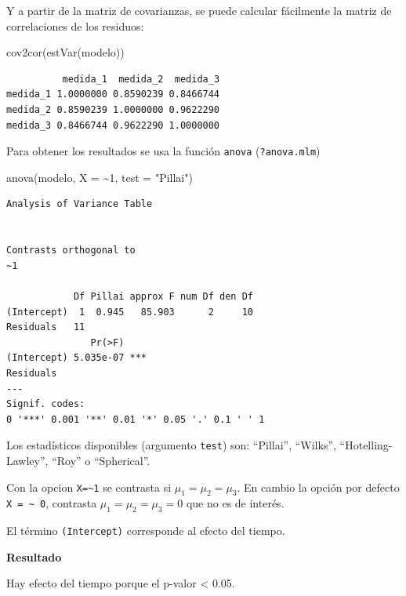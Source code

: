 \documentclass[
]{book}
\newenvironment{Shaded}{\begin{snugshade}}{\end{snugshade}}
\newcommand{\AttributeTok}[1]{\textcolor[rgb]{0.77,0.63,0.00}{#1}}
\newcommand{\DecValTok}[1]{\textcolor[rgb]{0.00,0.00,0.81}{#1}}
\newcommand{\FunctionTok}[1]{\textcolor[rgb]{0.00,0.00,0.00}{#1}}
\newcommand{\NormalTok}[1]{#1}
\newcommand{\SpecialCharTok}[1]{\textcolor[rgb]{0.00,0.00,0.00}{#1}}
\newcommand{\StringTok}[1]{\textcolor[rgb]{0.31,0.60,0.02}{#1}}
\begin{document}
Y a partir de la matriz de covarianzas, se puede calcular fácilmente la matriz de correlaciones de los residuos:

\begin{Shaded}
\begin{Highlighting}[]
\FunctionTok{cov2cor}\NormalTok{(}\FunctionTok{estVar}\NormalTok{(modelo))}
\end{Highlighting}
\end{Shaded}

\begin{verbatim}
          medida_1  medida_2  medida_3
medida_1 1.0000000 0.8590239 0.8466744
medida_2 0.8590239 1.0000000 0.9622290
medida_3 0.8466744 0.9622290 1.0000000
\end{verbatim}

Para obtener los resultados se usa la función \texttt{anova} (\texttt{?anova.mlm})

\begin{Shaded}
\begin{Highlighting}[]
\FunctionTok{anova}\NormalTok{(modelo, }\AttributeTok{X =} \SpecialCharTok{\textasciitilde{}}\DecValTok{1}\NormalTok{, }\AttributeTok{test =} \StringTok{"Pillai"}\NormalTok{)}
\end{Highlighting}
\end{Shaded}

\begin{verbatim}
Analysis of Variance Table


Contrasts orthogonal to
~1

            Df Pillai approx F num Df den Df
(Intercept)  1  0.945   85.903      2     10
Residuals   11                              
               Pr(>F)    
(Intercept) 5.035e-07 ***
Residuals                
---
Signif. codes:  
0 '***' 0.001 '**' 0.01 '*' 0.05 '.' 0.1 ' ' 1
\end{verbatim}

Los estadísticos disponibles (argumento \texttt{test}) son: ``Pillai'', ``Wilks'', ``Hotelling-Lawley'', ``Roy'' o ``Spherical''.

Con la opcion \texttt{X=\textasciitilde{}1} se contrasta si \(\mu_1 = \mu_2 = \mu_3\). En cambio la opción por defecto \texttt{X\ =\ \textasciitilde{}\ 0}, contrasta \(\mu_1 = \mu_2 = \mu_3=0\) que no es de interés.

El término \texttt{(Intercept)} corresponde al efecto del tiempo.

\textbf{Resultado}

Hay efecto del tiempo porque el p-valor \textless{} 0.05.
\end{document}
